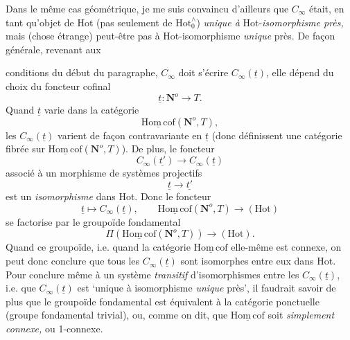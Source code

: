 \documentclass[11pt]{article}
\newcommand{\printedpage}[1]{\marginpar{\footnotesize p.~#1}}
\newcommand{\msp}[1]{\marginpar{\footnotesize [#1]}}
\newcommand{\Hotz}{\mathrm{Hot}^{\wedge}_{0}}
\newcommand{\Hot}{\mathrm{Hot}}
\newcommand{\Hc}{\underline{\mathrm{Hom\,cof}}}
\providecommand{\No}{}\renewcommand{\No}{\mathbf{N}^o}
\begin{document}
Dans le même cas géométrique, je me suis convaincu d'ailleurs que $C_{\infty}$ était, en tant qu'objet de Hot (pas seulement de $\Hotz$) \textit{unique à} Hot-\textit{isomorphisme près,} mais (chose étrange) peut-être pas à Hot-isomorphisme \textit{unique} près. De façon générale, revenant aux

\printedpage{74}
conditions du début du paragraphe, $C_\infty$ doit s'écrire $C_\infty(\underline{t})$, elle dépend du choix du foncteur cofinal
\[
\underline{t} : \No \longrightarrow T.
\]
Quand $\underline{t}$ varie dans la catégorie
\[
\Hc(\No, T),
\]
les $C_\infty(\underline{t})$ varient de façon contravariante en $\underline{t}$ (donc définissent une catégorie fibrée sur $\Hc(\No, T)$). De plus, le foncteur
\[
C_\infty(\underline{t'}) \longrightarrow C_\infty(\underline{t})
\]
associé à un morphisme de systèmes projectifs
\[
\underline{t} \longrightarrow \underline{t'}
\]
est un \textit{isomorphisme} dans Hot. Donc le
\msp{page 118}
foncteur
\[
\underline{t} \longmapsto C_\infty(\underline{t}), \qquad \Hc(\No, T) \longrightarrow (\Hot)
\]
se factorise par le groupoïde fondamental
\[
\Pi(\Hc(\No, T)) \longrightarrow (\Hot).
\]
Quand ce groupoïde, i.e. quand la catégorie $\Hc$ elle-même est connexe, on peut donc conclure que tous les $C_\infty(\underline{t})$ sont isomorphes entre eux dans Hot. Pour conclure même à un système \textit{transitif} d'isomorphismes entre les $C_\infty(\underline{t})$, i.e. que $C_\infty(\underline{t})$ est ‘unique à isomorphisme \textit{unique} près’, il faudrait savoir de plus que le groupoïde fondamental est équivalent à la catégorie ponctuelle (groupe fondamental trivial), ou, comme on dit, que $\Hc$ soit \textit{simplement connexe,} ou 1-connexe.
\end{document}
